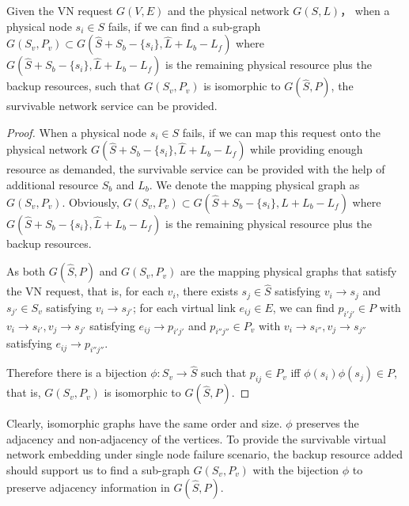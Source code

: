 \begin{theorem}
Given the VN request $G (V,E)$ and the physical network  $G (S,L)$， when a physical node $ {s_i} \in S $ fails, if we can find a sub-graph $G\left( {{S_v},{P_v}} \right) \subset G\left( {\hat S + {S_b} - \{ {s_i}\} ,\hat L + {L_b} - {L_f}} \right)$ where $G\left( {\hat S + {S_b} - \{ {s_i}\} ,\hat L + {L_b} - {L_f}} \right)$ is the remaining physical resource plus the backup resources, such that  $G\left( {{S_v},{P_v}} \right)$ is isomorphic to $G\left( {\hat S,P} \right)$, the survivable network service can be provided.
\label{fig:isomorphic}
\end{theorem}
\begin{proof}
When a physical node $ {s_i} \in S $ fails, if we can  map this request onto the physical network $G\left( {\hat S + {S_b} - \{ {s_i}\} ,\hat L + {L_b} - {L_f}} \right)$ while providing enough resource as demanded, the survivable service can be provided with the help of additional resource $S_b$ and $L_b$. We denote the mapping physical graph as $G\left( {{S_v},{P_v}} \right)$. Obviously,   $G\left( {{S_v},{P_v}} \right) \subset G\left( {\hat S + {S_b} - \{ {s_i}\} ,\hat L + {L_b} - {L_f}} \right)$ where $G\left( {\hat S + {S_b} - \{ {s_i}\} ,\hat L + {L_b} - {L_f}} \right)$ is the remaining physical resource plus the backup resources.

As both  $G\left( {\hat S,P}\right)$ and $G\left( {{S_v},{P_v}} \right)$ are the mapping physical graphs that satisfy  the VN request, that is, for each $v_i$, there exists ${s_j} \in \hat S$ satisfying  ${v_i} \to {s_j}$ and ${s_{j'}} \in {S_v}$ satisfying  ${v_i} \to {s_{j'}}$; for each virtual link ${e_{ij}} \in E$, we can find ${p_{i'j'}} \in P$ with ${v_i} \to {s_{i'}},{v_j} \to {s_{j'}}$ satisfying ${e_{ij}} \to {p_{i'j'}}$ and ${p_{i''j''}} \in P_v$ with ${v_{i}} \to {s_{i''}},{v_j} \to {s_{j''}}$ satisfying ${e_{ij}} \to {p_{i''j''}}$.

Therefore there is a bijection $\phi:S_v\rightarrow \hat S$ such that $p_{ij}\in P_v$ iff $\phi(s_i)\phi(s_j)\in P$, that is,  $G\left( {{S_v},{P_v}} \right)$ is isomorphic to $G\left( {\hat S,P} \right)$.
\end{proof}
Clearly, isomorphic graphs have the same order and size. $\phi$ preserves the adjacency and non-adjacency of the vertices. To provide the survivable virtual network embedding under single node failure scenario, the backup resource added should support us to find a sub-graph $G\left( {{S_v},{P_v}} \right)$ with the bijection $\phi$ to preserve adjacency information in $G\left( {\hat S,P} \right)$.






